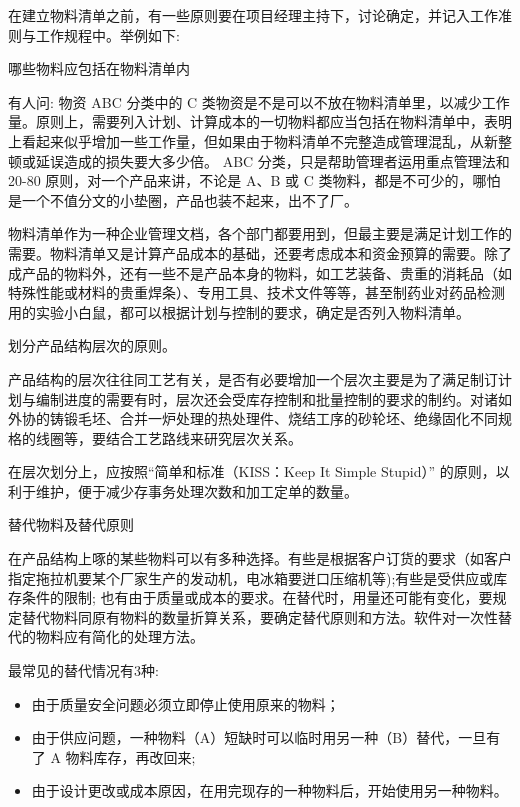         在建立物料清单之前，有一些原则要在项目经理主持下，讨论确定，并记入工作准则与工作规程中。举例如下:

        \begin{enumerate.zh}
            \item 哪些物料应包括在物料清单内

            有人问: 物资 ABC 分类中的 C 类物资是不是可以不放在物料清单里，以减少工作量。原则上，需要列入计划、计算成本的一切物料都应当包括在物料清单中，表明上看起来似乎增加一些工作量，但如果由于物料清单不完整造成管理混乱，从新整顿或延误造成的损失要大多少倍。 ABC 分类，只是帮助管理者运用重点管理法和 20-80 原则，对一个产品来讲，不论是 A、B 或 C 类物料，都是不可少的，哪怕是一个不值分文的小垫圈，产品也装不起来，出不了厂。

            物料清单作为一种企业管理文档，各个部门都要用到，但最主要是满足计划工作的需要。物料清单又是计算产品成本的基础，还要考虑成本和资金预算的需要。除了成产品的物料外，还有一些不是产品本身的物料，如工艺装备、贵重的消耗品（如特殊性能或材料的贵重焊条）、专用工具、技术文件等等，甚至制药业对药品检测用的实验小白鼠，都可以根据计划与控制的要求，确定是否列入物料清单。

            \item 划分产品结构层次的原则。

            产品结构的层次往往同工艺有关，是否有必要增加一个层次主要是为了满足制订计划与编制进度的需要有时，层次还会受库存控制和批量控制的要求的制约。对诸如外协的铸锻毛坯、合并一炉处理的热处理件、烧结工序的砂轮坯、绝缘固化不同规格的线圈等，要结合工艺路线来研究层次关系。

            在层次划分上，应按照“简单和标准（KISS：Keep It Simple Stupid）” 的原则，以利于维护，便于减少存事务处理次数和加工定单的数量。

            \item  替代物料及替代原则

            在产品结构上啄的某些物料可以有多种选择。有些是根据客户订货的要求（如客户指定拖拉机要某个厂家生产的发动机，电冰箱要迸口压缩机等);有些是受供应或库存条件的限制; 也有由于质量或成本的要求。在替代时，用量还可能有变化，要规定替代物料同原有物料的数量折算关系，要确定替代原则和方法。软件对一次性替代的物料应有简化的处理方法。

            最常见的替代情况有3种:
                \begin{itemize}
                \item 由于质量安全问题必须立即停止使用原来的物料；
                \item 由于供应问题，一种物料（A）短缺时可以临时用另一种（B）替代，一旦有了 A 物料库存，再改回来;
                \item 由于设计更改或成本原因，在用完现存的一种物料后，开始使用另一种物料。
                \end{itemize}

        \end{enumerate.zh}

